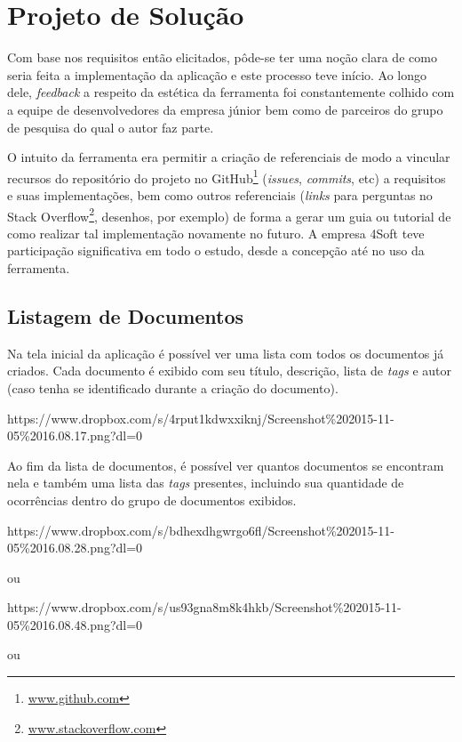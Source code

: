 \chapter{Projeto de Solução}

Com base nos requisitos então elicitados, pôde-se ter uma noção clara de como seria feita a implementação da aplicação e este processo teve início. Ao longo dele, \textit{feedback} a respeito da estética da ferramenta foi constantemente colhido com a equipe de desenvolvedores da empresa júnior bem como de parceiros do grupo de pesquisa do qual o autor faz parte.

O intuito da ferramenta era permitir a criação de referenciais de modo a vincular recursos do repositório do projeto no GitHub\footnote{\url{www.github.com}} (\textit{issues}, \textit{commits}, etc) a requisitos e suas implementações, bem como outros referenciais (\textit{links} para perguntas no Stack Overflow\footnote{\url{www.stackoverflow.com}}, desenhos, por exemplo) de forma a gerar um guia ou tutorial de como realizar tal implementação novamente no futuro. A empresa 4Soft teve participação significativa em todo o estudo, desde a concepção até no uso da ferramenta.


\section{Listagem de Documentos}

Na tela inicial da aplicação é possível ver uma lista com todos os documentos já criados. Cada documento é exibido com seu título, descrição, lista de \textit{tags} e autor (caso tenha se identificado durante a criação do documento).

https://www.dropbox.com/s/4rput1kdwxxiknj/Screenshot\%202015-11-05\%2016.08.17.png?dl=0

Ao fim da lista de documentos, é possível ver quantos documentos se encontram nela e também uma lista das \textit{tags} presentes, incluindo sua quantidade de ocorrências dentro do grupo de documentos exibidos.

https://www.dropbox.com/s/bdhexdhgwrgo6fl/Screenshot\%202015-11-05\%2016.08.28.png?dl=0

ou

https://www.dropbox.com/s/us93gna8m8k4hkb/Screenshot\%202015-11-05\%2016.08.48.png?dl=0

ou

